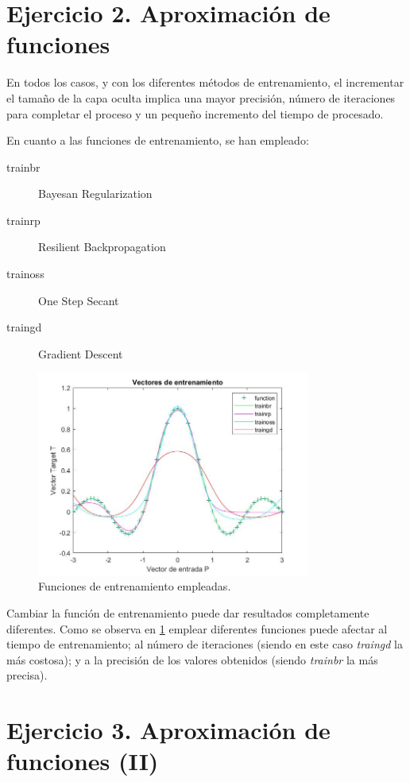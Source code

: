 \documentclass{article}
\begin{document}
\section{Ejercicio 2. Aproximación de funciones}

En todos los casos, y con los diferentes métodos de entrenamiento, el
incrementar el tamaño de la capa oculta implica una mayor precisión, número de
iteraciones para completar el proceso y un pequeño incremento del tiempo de
procesado.

En cuanto a las funciones de entrenamiento, se han empleado:

\begin{description}
\item [trainbr] Bayesan Regularization
\item [trainrp] Resilient Backpropagation
\item [trainoss] One Step Secant
\item [traingd] Gradient Descent
\end{description}

\begin{figure}[h]
 \centering
 \includegraphics[width=0.8\textwidth]{../I_ex2/training_functions.jpg}
 \caption{Funciones de entrenamiento empleadas.} 
 \label{tf}
\end{figure}

Cambiar la función de entrenamiento puede dar resultados completamente
diferentes. Como se observa en \hyperref[tf]{\ref{tf}} emplear diferentes
funciones puede afectar al tiempo de entrenamiento; al número de iteraciones
(siendo en este caso \textit{traingd} la más costosa); y a la precisión de los
valores obtenidos (siendo \textit{trainbr} la más precisa).

\section{Ejercicio 3. Aproximación de funciones (II)}
\end{document}

